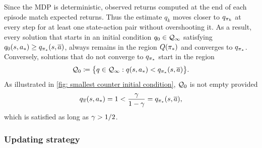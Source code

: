 Since the MDP is deterministic, observed returns computed at the end of each episode match expected returns.
Thus the estimate $q_k$ moves closer to $q_{\pi_k}$ at every step for at least one state-action pair without overshooting it.
As a result, every solution that starts in an initial condition $q_0 \in \mathcal{Q}_\infty$ satisfying $q_0(s, {a}_*) \geq q_{{\pi}_*}(s, \overline{a})$, always remains in the region $Q({{\pi}_*})$ and converges to $q_{{\pi}_*}$.
Conversely, solutions that do not converge to $q_{{\pi}_*}$ start in the region
\begin{align}
    \mathcal{Q}_0 \coloneqq \big\{ q \in \mathcal{Q}_\infty : q(s, {a}_*) < q_{{\pi}_*}(s, \overline{a}) \big\} .
\end{align}
As illustrated in \autoref{fig: smallest counter initial condition}, $\mathcal{Q}_0$
is not empty provided
\begin{align*}
    q_{\overline{\pi}}(s, {a}_*) = 1 
    < \dfrac{\gamma}{1-\gamma} = q_{{\pi}_*}(s, \overline{a}) ,
\end{align*}
which is satisfied as long as $\gamma > 1/2$.





\subsubsection{Updating strategy}
\label{sec: sampling strat of ex 512}


